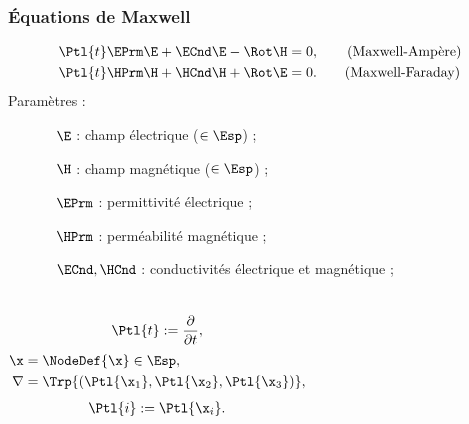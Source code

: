 \begin{frame}
\frametitle{Équations de Maxwell}
\vfill
\begin{align*}
	\Ptl{t} \EPrm \E + \ECnd \E - \Rot \H &= 0 ,
	\tag{Maxwell-Ampère}
	\\
	\Ptl{t} \HPrm \H + \HCnd \H + \Rot \E &= 0 .
	\tag{Maxwell-Faraday}
\end{align*}
\vfill
Paramètres :
\begin{itemize}
\item[]
\begin{itemize}
\item [$\E$] : champ électrique ($\in \Esp$) ;
\item [$\H$] : champ magnétique ($\in \Esp$) ;
\item [$\EPrm$] : permittivité électrique ;
\item [$\HPrm$] : perméabilité magnétique ;
\item [$\ECnd,\HCnd$] : conductivités électrique et magnétique ;
\end{itemize}
\end{itemize}
\vfill
\begin{columns}
\begin{align*}
\Ptl{t} := \frac{\partial}{\partial t} ,
\end{align*}
\begin{align*}
\x &= \NodeDef{\x} \in \Esp, \\
\nabla &= \Trp{(\Ptl{\x_1}, \Ptl{\x_2}, \Ptl{\x_3})} ,
\end{align*}
\begin{align*}
\Ptl{i} := \Ptl{\x_i} .
\end{align*}
\end{columns}
\vfill
\end{frame}

